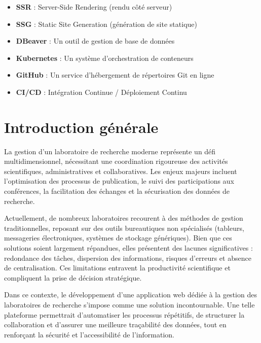 \documentclass{rapportPfe}
\begin{document}
\begin{itemize}
	  \item \textbf{SSR} : Server-Side Rendering (rendu côté serveur)
	  \item \textbf{SSG} : Static Site Generation (génération de site statique)
	  \item \textbf{DBeaver} : Un outil de gestion de base de données
	  \item \textbf{Kubernetes} : Un système d'orchestration de conteneurs
	  \item \textbf{GitHub} : Un service d'hébergement de répertoires Git en ligne
	  \item \textbf{CI/CD} : Intégration Continue / Déploiement Continu
	\end{itemize}

\newpage
\chapter*{Introduction générale}

La gestion d’un laboratoire de recherche moderne représente un défi multidimensionnel, nécessitant une coordination rigoureuse des activités scientifiques, administratives et collaboratives. Les enjeux majeurs incluent l’optimisation des processus de publication, le suivi des participations aux conférences, la facilitation des échanges et la sécurisation des données de recherche.

Actuellement, de nombreux laboratoires recourent à des méthodes de gestion traditionnelles, reposant sur des outils bureautiques non spécialisés (tableurs, messageries électroniques, systèmes de stockage génériques). Bien que ces solutions soient largement répandues, elles présentent des lacunes significatives : redondance des tâches, dispersion des informations, risques d’erreurs et absence de centralisation. Ces limitations entravent la productivité scientifique et compliquent la prise de décision stratégique.

Dans ce contexte, le développement d’une application web dédiée à la gestion des laboratoires de recherche s’impose comme une solution incontournable. Une telle plateforme permettrait d’automatiser les processus répétitifs, de structurer la collaboration et d’assurer une meilleure traçabilité des données, tout en renforçant la sécurité et l’accessibilité de l’information.

\newpage
\tabledematieres

\newpage
\listoffigures

\newpage
\listoftables
\end{document}
